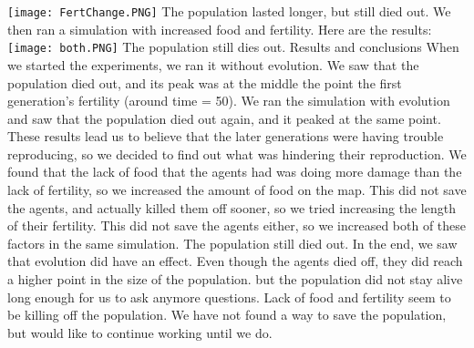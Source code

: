 \documentclass[11pt]{article}
\begin{document}
\begin{multicols}{2}
\texttt{[image: FertChange.PNG]} \newline
The population lasted longer, but still died out. We then ran a simulation with increased food and fertility. Here are the results: \newline
\texttt{[image: both.PNG]} \newline
The population still dies out. \newline
\center 
Results and conclusions
\flushleft
When we started the experiments, we ran it without evolution. We saw that the population died out, and its peak was at the middle the point the first generation's fertility (around time = 50). We ran the simulation with evolution and saw that the population died out again, and it peaked at the same point. These results lead us to believe that the later generations were having trouble reproducing, so we decided to find out what was hindering their reproduction. We found that the lack of food that the agents had was doing more damage than the lack of fertility, so we increased the amount of food on the map. This did not save the agents, and actually killed them off sooner, so we tried increasing the length of their fertility. This did not save the agents either, so we increased both of these factors in the same simulation. The population still died out. \newline
In the end, we saw that evolution did have an effect. Even though the agents died off, they did reach a higher point in the size of the population. but the population did not stay alive long enough for us to ask anymore questions. Lack of food and fertility seem to be killing off the population. We have not found a way to save the population, but would like to continue working until we do.









\end{multicols}
\end{document}
